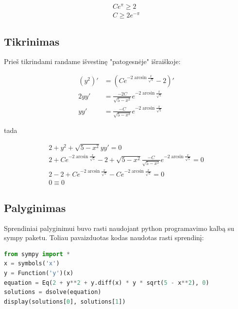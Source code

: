 \documentclass[11pt]{article}
\begin{document}
\begin{equation}
    \begin{split}
        Ce^\pi\geqslant2\\
        C\geqslant2e^{-\pi}
    \end{split}
\end{equation}


\newpage
\subsection{Tikrinimas}

Prieš tikrindami randame išvestinę "patogesnėje" išraiškoje:

\begin{equation}
    \begin{split}
        (y^2)'&=(Ce^{-2\arcsin{\frac{x}{\sqrt{5}}}} - 2)' \\
        2yy'&=\frac{-2C}{\sqrt{5-x^2}}e^{-2\arcsin{\frac{x}{\sqrt{5}}}}\\
        yy'&=\frac{-C}{\sqrt{5-x^2}}e^{-2\arcsin{\frac{x}{\sqrt{5}}}}
    \end{split}
\end{equation}

tada

\begin{equation}
    \begin{split}
        2+y^2+\sqrt{5-x^2}yy'=0\\
        2+Ce^{-2\arcsin{\frac{x}{\sqrt{5}}}} - 2+\sqrt{5-x^2}\frac{-C}{\sqrt{5-x^2}}e^{-2\arcsin{\frac{x}{\sqrt{5}}}}=0\\
        2-2+Ce^{-2\arcsin{\frac{x}{\sqrt{5}}}}-Ce^{-2\arcsin{\frac{x}{\sqrt{5}}}}=0\\
        0\equiv0
    \end{split}
\end{equation}

\subsection{Palyginimas}

Sprendiniai palyginimui buvo rasti naudojant 
python programavimo kalbą su sympy paketu. 
Toliau pavaizduotas kodas naudotas rasti sprendinį:

\begin{lstlisting}[language=Python]
from sympy import *
x = symbols('x')
y = Function('y')(x)
equation = Eq(2 + y**2 + y.diff(x) * y * sqrt(5 - x**2), 0)
solutions = dsolve(equation)
display(solutions[0], solutions[1])
\end{lstlisting}
\end{document}
